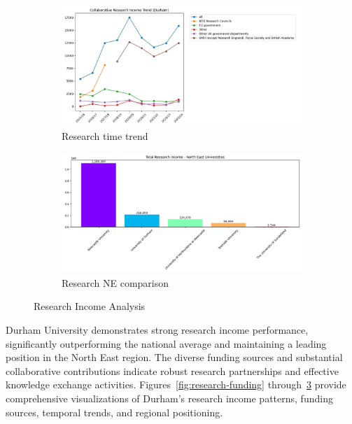 \documentclass[journal,onecolumn, 10pt,draftclsnofoot]{IEEEtran}
\begin{document}
\begin{figure}[h]
\begin{subfigure}[b]{0.48\textwidth}
    \label{fig:research-income-type}
\end{subfigure}
\vspace{0.6cm}
\begin{subfigure}[b]{0.48\textwidth}
    \centering
    \includegraphics[width=\textwidth]{Fig/figure5.research_time_trend.png}
    \caption{Research time trend}
    \label{fig:research-time-trend}
\end{subfigure}
\hfill
\begin{subfigure}[b]{0.48\textwidth}
    \centering
    \includegraphics[width=\textwidth]{Fig/figure6.research_ne_comparison.png}
    \caption{Research NE comparison}
    \label{fig:research-ne-comparison}
\end{subfigure}
\caption{Research Income Analysis}
\label{fig:research-income-analysis}
\end{figure}

Durham University demonstrates strong research income performance, significantly outperforming the national average and maintaining a leading position in the North East region. The diverse funding sources and substantial collaborative contributions indicate robust research partnerships and effective knowledge exchange activities. Figures~\ref{fig:research-funding} through~\ref{fig:research-ne-comparison} provide comprehensive visualizations of Durham's research income patterns, funding sources, temporal trends, and regional positioning.
\end{document}
